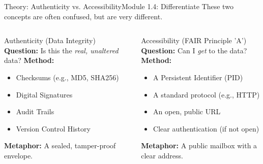 \begin{frame}{Theory: Authenticity vs. Accessibility}{Module 1.4: Differentiate}
    These two concepts are often confused, but are very different.
    
    \begin{columns}
        \begin{block}{Authenticity (Data Integrity)}
            \textbf{Question:} Is this the \emph{real, unaltered} data?
            \pause
            \textbf{Method:}
            \begin{itemize}
                \item Checksums (e.g., MD5, SHA256)
                \item Digital Signatures
                \item Audit Trails
                \item Version Control History
            \end{itemize}
            \textbf{Metaphor:} A sealed, tamper-proof envelope.
        \end{block}
        
        \begin{block}{Accessibility (FAIR Principle 'A')}
            \textbf{Question:} Can I \emph{get} to the data?
            \pause
            \textbf{Method:}
            \begin{itemize}
                \item A Persistent Identifier (PID)
                \item A standard protocol (e.g., HTTP)
                \item An open, public URL
                \item Clear authentication (if not open)
            \end{itemize}
            \textbf{Metaphor:} A public mailbox with a clear address.
        \end{block}
    \end{columns}
\end{frame}

